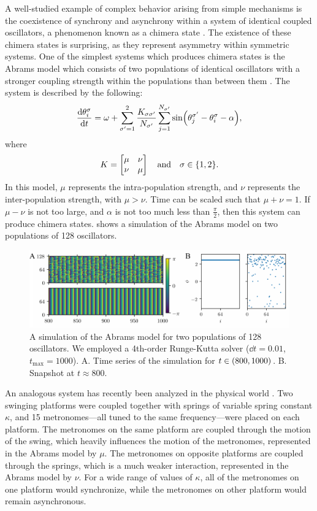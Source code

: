 A well-studied example of complex behavior arising from simple mechanisms is the coexistence of synchrony and asynchrony within a system of identical coupled oscillators, a phenomenon known as a chimera state \cite{Kuramoto2002,Abrams2004}.
The existence of these chimera states is surprising, as they represent asymmetry within symmetric systems.
One of the simplest systems which produces chimera states is the Abrams model which consists of two populations of identical oscillators with a stronger coupling strength within the populations than between them \cite{Abrams2008}.
The system is described by the following:
\begin{equation}
  \label{eq:abrams}
  \dv{\theta_{i}^{\sigma}}{t}
  =
  \omega
  +
  \sum_{\sigma' = 1}^{2} \frac{K_{\sigma \sigma'}}{N_{\sigma'}} \sum_{j = 1}^{N_{\sigma'}} \sin(\theta_{j}^{\sigma'} - \theta_{i}^{\sigma} - \alpha),
\end{equation}
where
\begin{equation*}
  K
  =
  \bmqty{\mu & \nu \\ \nu & \mu}
  \qand
  \sigma \in \Bqty{1, 2}.
\end{equation*}
In this model, $\mu$ represents the intra-population strength, and $\nu$ represents the inter-population strength, with $\mu > \nu$.
Time can be scaled such that $\mu + \nu = 1$.
If $\mu - \nu$ is not too large, and $\alpha$ is not too much less than $\frac{\pi}{2}$, then this system can produce chimera states.
 shows a simulation of the Abrams model on two populations of 128 oscillators.
\begin{figure}[ht]
  \centering
  \includegraphics[width=\textwidth]{figure/abrams.pdf}
  \caption[Abrams simulation]{A simulation of the Abrams model for two populations of 128 oscillators.
    We employed a 4th-order Runge-Kutta solver ($\dd{t} = 0.01$, $t_{\text{max}} = 1000$).
    A. Time series of the simulation for $t \in \pqty{800, 1000}$.
    B. Snapshot at $t \approx 800$.
  }
  \label{fig:abrams}
\end{figure}

An analogous system has recently been analyzed in the physical world \cite{Martens2013}.
Two swinging platforms were coupled together with springs of variable spring constant $\kappa$, and 15 metronomes---all tuned to the same frequency---were placed on each platform.
The metronomes on the same platform are coupled through the motion of the swing, which heavily influences the motion of the metronomes, represented in the Abrams model by $\mu$.
The metronomes on opposite platforms are coupled through the springs, which is a much weaker interaction, represented in the Abrams model by $\nu$.
For a wide range of values of $\kappa$, all of the metronomes on one platform would synchronize, while the metronomes on other platform would remain asynchronous.

